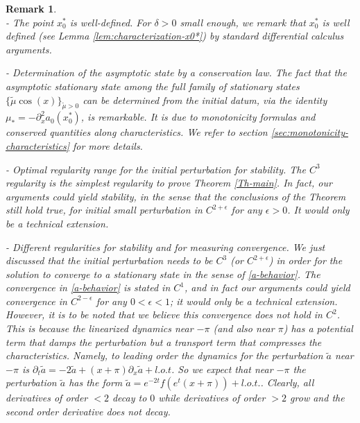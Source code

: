 \documentclass[12pt]{amsart}
\numberwithin{equation}{section}
\numberwithin{equation}{section}
\newtheorem{rmk}[thm]{Remark}
\begin{document}
\begin{rmk} \label{rk:ipe}\ \\
\emph{- The point $x_0^*$ is well-defined.} For $\delta>0$ small enough, we remark that $x^*_0$ is well defined (see Lemma \ref{lem:characterization-x0*}) by standard differential calculus arguments.

\smallskip

\noindent \emph{- Determination of the asymptotic state by a conservation law.} The fact that the asymptotic stationary state among the full family of stationary states $\{\tilde \mu \cos ( x) \}_{\tilde \mu>0}$ can be determined from the initial datum, via the identity $\mu_*=-\partial_x^2 a_0(x^*_0)$, is remarkable. It is due to monotonicity formulas and conserved quantities along characteristics. We refer to section \ref{sec:monotonicity-characteristics} for more details.

\smallskip

\noindent \emph{- Optimal regularity range for the initial perturbation for stability.} The $C^3$ regularity is the simplest regularity to prove Theorem \ref{Th-main}. In fact, our arguments could yield stability, in the sense that the conclusions of the Theorem still hold true, for initial small perturbation in $C^{2+\epsilon}$ for any $\epsilon>0$. It would only be a technical extension.

\smallskip

\noindent \emph{- Different regularities for stability and for measuring convergence}. We just discussed that the initial perturbation needs to be $C^3$ (or $C^{2+\epsilon}$) in order for the solution to converge to a stationary state in the sense of \eqref{a-behavior}. The convergence in \eqref{a-behavior} is stated in $C^1$, and in fact our arguments could yield convergence in $C^{2-\epsilon}$ for any $0<\epsilon< 1$; it would only be a technical extension. However, it is to be noted that we believe this convergence \emph{does not hold} in $C^2$. This is because the linearized dynamics near $-\pi$ (and also near $\pi$) has a potential term that damps the perturbation but a transport term that compresses the characteristics. Namely, to leading order the dynamics for the perturbation $\tilde a$ near $-\pi$ is $\partial_t \tilde a = -2\tilde a +(x+\pi)\partial_x \tilde a +l.o.t$. So we expect that near $-\pi$ the perturbation $\tilde a$ has the form $\tilde a = e^{-2t}f(e^t(x+\pi))+l.o.t.$. Clearly, all derivatives of order $<2$ decay to $0$ while derivatives of order $>2$ grow and the second order derivative does not decay.


\end{rmk}
\end{document}
